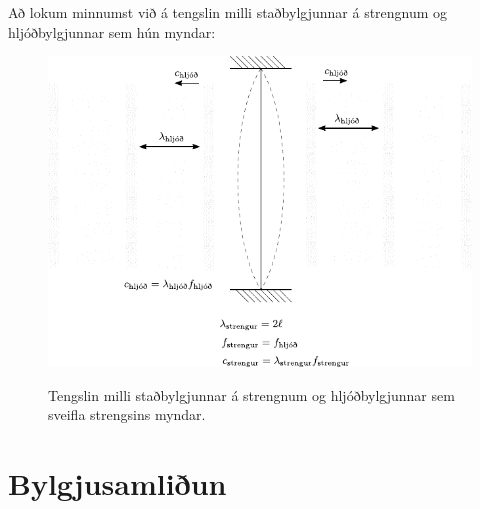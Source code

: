 \ifdefined \wholebook \else\documentclass[oneside]{book}\usepackage{EdlBook}\graphicspath{{figures/}}
\begin{document}
Að lokum minnumst við á tengslin milli staðbylgjunnar á strengnum og hljóðbylgjunnar sem hún myndar:

\begin{figure}[H]
    \centering
    \includegraphics{figures/hljodbylgja-strengur.pdf}
    \label{fig:my_label}
    \caption{Tengslin milli staðbylgjunnar á strengnum og hljóðbylgjunnar sem sveifla strengsins myndar.}
\end{figure}


\section{Bylgjusamliðun}
\end{document}
